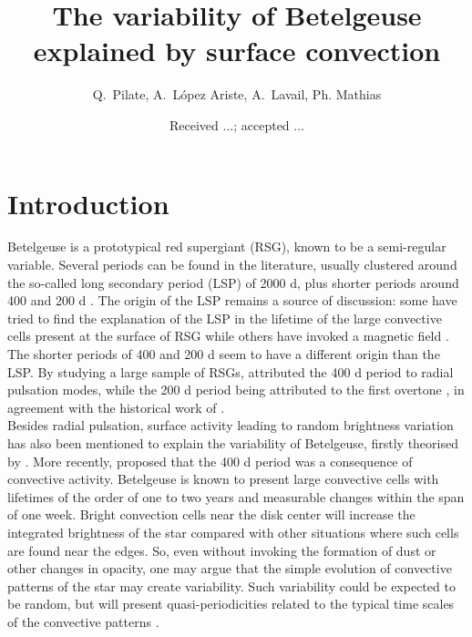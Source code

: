 \documentclass{aa}
\begin{document}
 


   \title{The variability  of Betelgeuse explained by surface convection}


    \author{{ Q.~Pilate},{ A.~L{\'o}pez Ariste},{ A.~Lavail},{ Ph. Mathias} }


   \date{Received ...; accepted ...}

 
  \abstract


   \keywords{
               }

   \maketitle
%

\section{Introduction}
Betelgeuse is a prototypical red supergiant (RSG), known to be a semi-regular variable. Several periods can be found in the 
literature, usually clustered around the so-called long secondary period (LSP) of 2000 d, plus shorter periods around 400 and 200 d \citep{kiss_variability_2006}. The origin of the LSP remains a source of discussion: some have tried to find the explanation of the LSP in the lifetime of the large convective cells present at the surface of RSG \citep[e.g][]{stothers_giant_2010} while others have invoked a magnetic field \citep{wood_long_2004}. The shorter periods of 400 and 200 d seem to have a different origin than the LSP. By studying a large sample of RSGs, \cite{kiss_variability_2006} attributed the 400 d period to radial pulsation modes, while the 200 d period being attributed to the first overtone \citep{joyce_standing_2020}, in agreement with the historical work of \cite{stothers_pulsation_1969}.\\

Besides radial pulsation, surface activity leading to random brightness variation has also been mentioned to explain the variability of Betelgeuse, firstly theorised by \cite{schwarzschild_scale_1975}. More recently, \cite{gray_mass_2008} proposed that the 400 d period was a consequence of convective activity. Betelgeuse is known to present large convective cells with lifetimes of the order of one to two years \citep{lopez_ariste_convective_2018} and measurable changes 
within the span of one week. Bright convection cells near the disk center will increase the integrated brightness of the star compared with other situations where such cells are found near the edges. So, even without invoking the formation of 
dust or other changes in opacity, one may argue that the simple evolution of convective patterns of the star may create variability. Such 
variability could be expected to be random, but will present quasi-periodicities related to the typical time scales of the 
convective patterns \citep{gray_mass_2008}. \\
\end{document}
